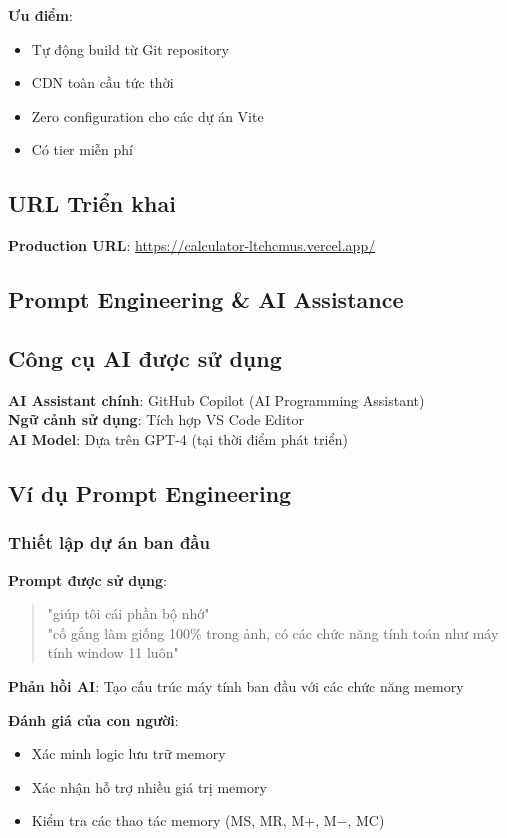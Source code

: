 \textbf{Ưu điểm}:
\begin{itemize}
    \item Tự động build từ Git repository
    \item CDN toàn cầu tức thời
    \item Zero configuration cho các dự án Vite
    \item Có tier miễn phí
\end{itemize}

\subsection{URL Triển khai}

\textbf{Production URL}: \url{https://calculator-ltchcmus.vercel.app/}

\subsection{Prompt Engineering \& AI Assistance}

\subsection{Công cụ AI được sử dụng}

\textbf{AI Assistant chính}: GitHub Copilot (AI Programming Assistant) \\
\textbf{Ngữ cảnh sử dụng}: Tích hợp VS Code Editor \\
\textbf{AI Model}: Dựa trên GPT-4 (tại thời điểm phát triển)

\subsection{Ví dụ Prompt Engineering}

\subsubsection{Thiết lập dự án ban đầu}

\textbf{Prompt được sử dụng}:
\begin{quote}
"giúp tôi cái phần bộ nhớ" \\
"cố gắng làm giống 100\% trong ảnh, có các chức năng tính toán như máy tính window 11 luôn"
\end{quote}

\textbf{Phản hồi AI}: Tạo cấu trúc máy tính ban đầu với các chức năng memory

\textbf{Đánh giá của con người}:
\begin{itemize}
    \item Xác minh logic lưu trữ memory
    \item Xác nhận hỗ trợ nhiều giá trị memory
    \item Kiểm tra các thao tác memory (MS, MR, M+, M−, MC)
\end{itemize}

